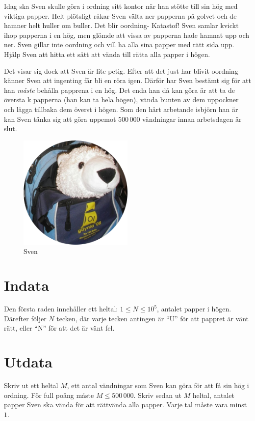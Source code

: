 Idag ska Sven skulle göra i ordning sitt kontor när han stötte till sin hög med viktiga papper.
Helt plötsligt råkar Sven välta ner papperna på golvet och de hamner helt huller om buller. Det blir oordning- Katastof!
Sven samlar kvickt ihop papperna i en hög, men glömde att vissa av papperna hade hamnat upp och ner.
Sven gillar inte oordning och vill ha alla sina papper med rätt sida upp.
Hjälp Sven att hitta ett sätt att vända till rätta alla papper i högen.

Det visar sig dock att Sven är lite petig.
Efter att det just har blivit oordning känner Sven att ingenting får bli en röra igen.
Därför har Sven bestämt sig för att han \emph{måste} behålla papprena i en hög.
Det enda han då kan göra är att ta de översta k papperna (han kan ta hela högen), vända bunten av dem uppockner och lägga tillbaka dem överst i högen.
Som den hårt arbetande isbjörn han är kan Sven tänka sig att göra uppemot $500\,000$ vändningar innan arbetsdagen är slut.

\begin{figure}[h]
	\centering
\includegraphics[width=0.5\textwidth]{sven-circular.png}
\caption{Sven}
\end{figure}

\section*{Indata}
Den första raden innehåller ett heltal: $1\leq N \leq 10^5$, antalet papper i högen.
Därefter följer $N$ tecken, där varje tecken antingen är ``U'' för att pappret är vänt rätt, eller ``N'' för att det är vänt fel. 

\section*{Utdata}
Skriv ut ett heltal $M$, ett antal vändningar som Sven kan göra för att få sin hög i ordning. För full poäng måste  $M \leq 500\,000$.
Skriv sedan ut $M$ heltal, antalet papper Sven ska vända för att rättvända alla papper. Varje tal måste vara minst $1$.

